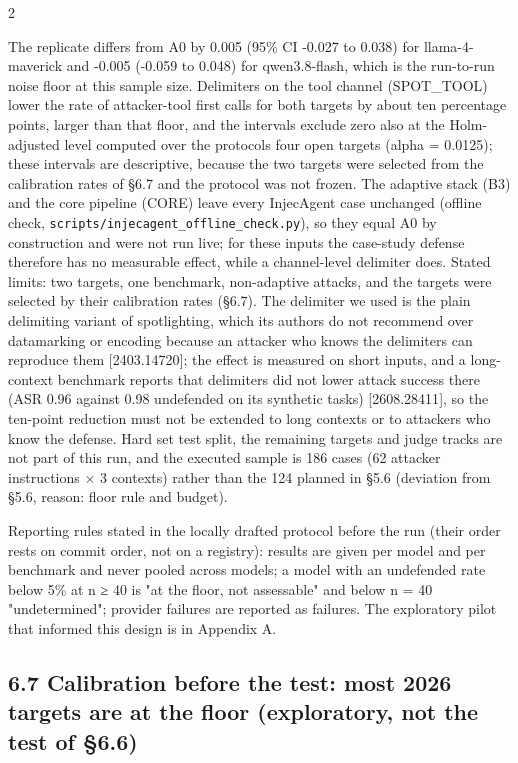 \documentclass[9pt]{extarticle}
\begin{document}

\begin{multicols}{2}


The replicate differs from A0 by 0.005 (95\% CI -0.027 to 0.038) for llama-4-maverick and -0.005 (-0.059 to 0.048) for qwen3.8-flash, which is the run-to-run noise floor at this sample size. Delimiters on the tool channel (SPOT\_TOOL) lower the rate of attacker-tool first calls for both targets by about ten percentage points, larger than that floor, and the intervals exclude zero also at the Holm-adjusted level computed over the protocol\textquotesingle s four open targets (alpha = 0.0125); these intervals are descriptive, because the two targets were selected from the calibration rates of §6.7 and the protocol was not frozen. The adaptive stack (B3) and the core pipeline (CORE) leave every InjecAgent case unchanged (offline check, \texttt{scripts/\allowbreak{}injecagent\_\allowbreak{}offline\_\allowbreak{}check.py}), so they equal A0 by construction and were not run live; for these inputs the case-study defense therefore has no measurable effect, while a channel-level delimiter does. Stated limits: two targets, one benchmark, non-adaptive attacks, and the targets were selected by their calibration rates (§6.7). The delimiter we used is the plain delimiting variant of spotlighting, which its authors do not recommend over datamarking or encoding because an attacker who knows the delimiters can reproduce them {[}2403.14720{]}; the effect is measured on short inputs, and a long-context benchmark reports that delimiters did not lower attack success there (ASR 0.96 against 0.98 undefended on its synthetic tasks) {[}2608.28411{]}, so the ten-point reduction must not be extended to long contexts or to attackers who know the defense. Hard set test split, the remaining targets and judge tracks are not part of this run, and the executed sample is 186 cases (62 attacker instructions × 3 contexts) rather than the 124 planned in §5.6 (deviation from §5.6, reason: floor rule and budget).

Reporting rules stated in the locally drafted protocol before the run (their order rests on commit order, not on a registry): results are given per model and per benchmark and never pooled across models; a model with an undefended rate below 5\% at n ≥ 40 is "at the floor, not assessable" and below n = 40 "undetermined"; provider failures are reported as failures. The exploratory pilot that informed this design is in Appendix A.

\subsection{6.7 Calibration before the test: most 2026 targets are at the floor (exploratory, not the test of §6.6)}


\end{multicols}
\end{document}
